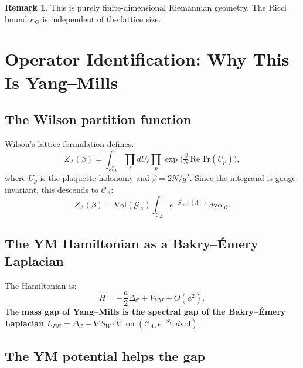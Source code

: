 \documentclass[11pt]{article}
\theoremstyle{definition}
\newtheorem{remark}[theorem]{Remark}
\newcommand{\calA}{\mathcal{A}}
\newcommand{\calG}{\mathcal{G}}
\newcommand{\calC}{\mathcal{C}}
\newcommand{\Tr}{\mathrm{Tr}}
\begin{document}
\begin{remark}
This is purely finite-dimensional Riemannian geometry. The Ricci bound $\kappa_G$ is independent of the lattice size.
\end{remark}


\section{Operator Identification: Why This Is Yang--Mills}
\label{sec:identification}

\subsection{The Wilson partition function}

Wilson's lattice formulation \cite{Wilson74} defines:
\begin{equation}\label{eq:wilson-Z}
    Z_\Lambda(\beta) = \int_{\calA_\Lambda} \prod_\ell dU_\ell \prod_p \exp\bigl(\tfrac{\beta}{N}\, \mathrm{Re}\,\Tr(U_p)\bigr),
\end{equation}
where $U_p$ is the plaquette holonomy and $\beta = 2N/g^2$. Since the integrand is gauge-invariant, this descends to $\calC_\Lambda$:
\begin{equation}\label{eq:wilson-quotient}
    Z_\Lambda(\beta) = \mathrm{Vol}(\calG_\Lambda) \int_{\calC_\Lambda} e^{-S_W([A])}\, d\mathrm{vol}_\calC.
\end{equation}

\subsection{The YM Hamiltonian as a Bakry--\'Emery Laplacian}

The Hamiltonian is:
\begin{equation}\label{eq:hamiltonian}
    H = -\frac{a}{2} \Delta_\calC + V_{YM} + O(a^2),
\end{equation}
The \textbf{mass gap of Yang--Mills is the spectral gap of the Bakry--\'Emery Laplacian} $L_{BE} = \Delta_\calC - \nabla S_W \cdot \nabla$ on $(\calC_\Lambda, e^{-S_W}\, d\mathrm{vol})$.

\subsection{The YM potential helps the gap}
\end{document}

